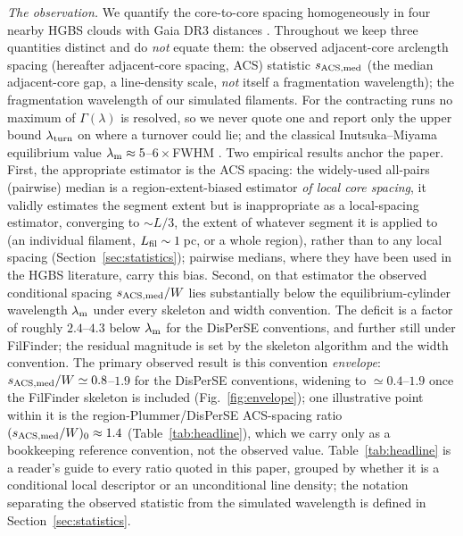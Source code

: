 \documentclass[usenatbib,twoside,twocolumn]{mnras}
\begin{document}
\emph{The observation.} We quantify the core-to-core spacing homogeneously in four nearby HGBS clouds with Gaia DR3 distances \citep{Zhang2023}. Throughout we keep three quantities distinct and do \emph{not} equate them: the observed adjacent-core arclength spacing (hereafter adjacent-core spacing, ACS) statistic $s_{\rm ACS,med}$ (the median adjacent-core gap, a line-density scale, \emph{not} itself a fragmentation wavelength); the fragmentation wavelength of our simulated filaments. For the contracting runs no maximum of $\Gamma(\lambda)$ is resolved, so we never quote one and report only the upper bound $\lambda_{\rm turn}$ on where a turnover could lie; and the classical Inutsuka--Miyama equilibrium value $\lambda_{\rm m}\approx5$--$6\times$FWHM \citep{Inutsuka1992,Fischera2012}. Two empirical results anchor the paper. First, the appropriate estimator is the ACS spacing: the widely-used all-pairs (pairwise) median is a region-extent-biased estimator \emph{of local core spacing}, it validly estimates the segment extent but is inappropriate as a local-spacing estimator, converging to $\sim L/3$, the extent of whatever segment it is applied to (an individual filament, $L_{\rm fil}\sim1$\,pc, or a whole region), rather than to any local spacing (Section~\ref{sec:statistics}); pairwise medians, where they have been used in the HGBS literature, carry this bias. Second, on that estimator the observed conditional spacing $s_{\rm ACS,med}/W$ lies substantially below the equilibrium-cylinder wavelength $\lambda_{\rm m}$ under every skeleton and width convention. The deficit is a factor of roughly $2.4$--$4.3$ below $\lambda_{\rm m}$ for the DisPerSE conventions, and further still under FilFinder; the residual magnitude is set by the skeleton algorithm and the width convention. The primary observed result is this convention \emph{envelope}: $s_{\rm ACS,med}/W\simeq0.8$--$1.9$ for the DisPerSE conventions, widening to $\simeq0.4$--$1.9$ once the FilFinder skeleton is included (Fig.~\ref{fig:envelope}); one illustrative point within it is the region-Plummer/DisPerSE ACS-spacing ratio $(s_{\rm ACS,med}/W)_0\approx1.4$ (Table~\ref{tab:headline}), which we carry only as a bookkeeping reference convention, not the observed value. Table~\ref{tab:headline} is a reader's guide to every ratio quoted in this paper, grouped by whether it is a conditional local descriptor or an unconditional line density; the notation separating the observed statistic from the simulated wavelength is defined in Section~\ref{sec:statistics}.
\end{document}
